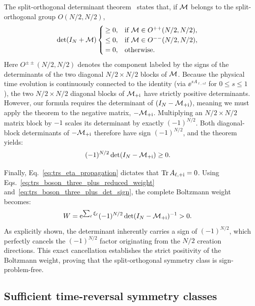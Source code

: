 The split-orthogonal determinant theorem~\cite{wang2015prl} states that, if $\mathcal{M}$ belongs to the split-orthogonal group $O(N/2,N/2)$,
\begin{equation}
    \det(I_N+\mathcal{M})
    \begin{cases}
        \ge 0, & \text{if }\mathcal{M}\in O^{++}(N/2,N/2),\\
        \le 0, & \text{if }\mathcal{M}\in O^{--}(N/2,N/2),\\
        =0, & \text{otherwise}.
    \end{cases}
\end{equation}
Here $O^{\pm\pm}(N/2,N/2)$ denotes the component labeled by the signs of the determinants of the two diagonal $N/2\times N/2$ blocks of $\mathcal{M}$. Because the physical time evolution is continuously connected to the identity (via $\ee^{sA_{\ell,+\ii}}$ for $0\le s\le1$), the two $N/2 \times N/2$ diagonal blocks of $\mathcal{M}_{+\mathrm{i}}$ have strictly positive determinants. However, our formula requires the determinant of $(I_N - \mathcal{M}_{+\mathrm{i}})$, meaning we must apply the theorem to the negative matrix, $-\mathcal{M}_{+\mathrm{i}}$. Multiplying an $N/2 \times N/2$ matrix block by $-1$ scales its determinant by exactly $(-1)^{N/2}$. Both diagonal-block determinants of $-\mathcal{M}_{+\mathrm{i}}$ therefore have sign $(-1)^{N/2}$, and the theorem yields:
\begin{equation}
    (-1)^{N/2}\det(I_N-\mathcal{M}_{+\mathrm{i}})\ge0.
    \label{eq:trs_boson_three_plus_det_sign}
\end{equation}

Finally, Eq.~\eqref{eq:trs_eta_propagation} dictates that $\operatorname{Tr} A_{\ell,+\mathrm{i}}=0$. Using Eqs.~\eqref{eq:trs_boson_three_plus_reduced_weight} and~\eqref{eq:trs_boson_three_plus_det_sign}, the complete Boltzmann weight becomes:
\begin{equation}
    W=\mathrm{e}^{\sum_\ell\xi_\ell}
    (-1)^{N/2}\det(I_N-\mathcal{M}_{+\mathrm{i}})^{-1}>0.
    \label{eq:trs_boson_three_plus_weight}
\end{equation}
As explicitly shown, the determinant inherently carries a sign of $(-1)^{N/2}$, which perfectly cancels the $(-1)^{N/2}$ factor originating from the $N/2$ creation directions. This exact cancellation establishes the strict positivity of the Boltzmann weight, proving that the split-orthogonal symmetry class is sign-problem-free.

\subsection{Sufficient time-reversal symmetry classes}
\label{app:trs_classes}

